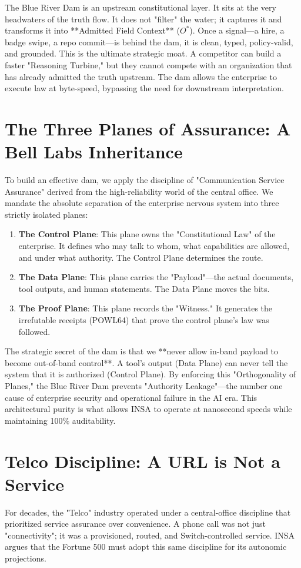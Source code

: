 \documentclass[12pt,a4paper,oneside]{book}
\begin{document}
The Blue River Dam is an upstream constitutional layer. It sits at the very headwaters of the truth flow. It does not "filter" the water; it captures it and transforms it into **Admitted Field Context** ($O^*$). Once a signal---a hire, a badge swipe, a repo commit---is behind the dam, it is clean, typed, policy-valid, and grounded. This is the ultimate strategic moat. A competitor can build a faster "Reasoning Turbine," but they cannot compete with an organization that has already admitted the truth upstream. The dam allows the enterprise to execute law at byte-speed, bypassing the need for downstream interpretation.

\section{The Three Planes of Assurance: A Bell Labs Inheritance}
To build an effective dam, we apply the discipline of "Communication Service Assurance" derived from the high-reliability world of the central office. We mandate the absolute separation of the enterprise nervous system into three strictly isolated planes:

\begin{enumerate}
    \item \textbf{The Control Plane}: This plane owns the "Constitutional Law" of the enterprise. It defines who may talk to whom, what capabilities are allowed, and under what authority. The Control Plane determines the route.
    \item \textbf{The Data Plane}: This plane carries the "Payload"---the actual documents, tool outputs, and human statements. The Data Plane moves the bits.
    \item \textbf{The Proof Plane}: This plane records the "Witness." It generates the irrefutable receipts (POWL64) that prove the control plane's law was followed.
\end{enumerate}

The strategic secret of the dam is that we **never allow in-band payload to become out-of-band control**. A tool's output (Data Plane) can never tell the system that it is authorized (Control Plane). By enforcing this "Orthogonality of Planes," the Blue River Dam prevents "Authority Leakage"---the number one cause of enterprise security and operational failure in the AI era. This architectural purity is what allows INSA to operate at nanosecond speeds while maintaining 100\% auditability.

\section{Telco Discipline: A URL is Not a Service}
For decades, the "Telco" industry operated under a central-office discipline that prioritized service assurance over convenience. A phone call was not just "connectivity"; it was a provisioned, routed, and Switch-controlled service. INSA argues that the Fortune 500 must adopt this same discipline for its autonomic projections. 
\end{document}
